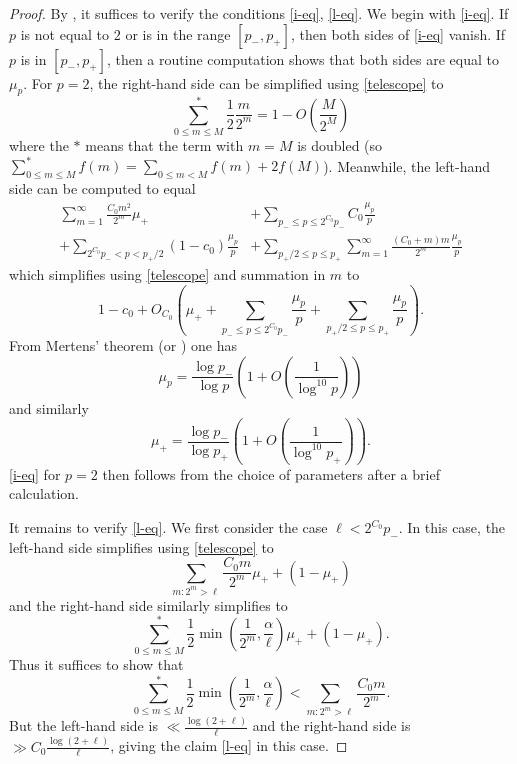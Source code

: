 \documentclass[10pt,a4paper,reqno]{amsart}
\numberwithin{equation}{section}
\theoremstyle{plain}
\theoremstyle{definition}
\begin{document}
\begin{proof}
By , it suffices to verify the conditions \eqref{i-eq}, \eqref{l-eq}.  We begin with \eqref{i-eq}.  If $p$ is not equal to $2$ or is in the range $[p_-,p_+]$, then both sides of \eqref{i-eq} vanish.  If $p$ is in $[p_-,p_+]$, then a routine computation shows that both sides are equal to $\mu_p$.  For $p=2$, the right-hand side can be simplified using \eqref{telescope} to
$$ \sum_{0 \leq m \leq M}^* \frac{1}{2} \frac{m}{2^m} = 1 - O\left( \frac{M}{2^M} \right)$$
where the $*$ means that the term with $m=M$ is doubled (so $\sum_{0 \leq m \leq M}^* f(m) = \sum_{0 \leq m<M} f(m) + 2 f(M)$).  Meanwhile, the left-hand side can be computed to equal
\begin{align*}
  \sum_{m=1}^\infty \frac{C_0 m^2}{2^m} \mu_+ & + \sum_{p_- \leq p \leq 2^{C_0} p_-} C_0 \frac{\mu_p}{p} \\
   + \sum_{2^{C_0} p_- < p < p_+/2} (1-c_0) \frac{\mu_p}{p} & + \sum_{p_+/2 \leq p \leq p_+} \sum_{m=1}^\infty \frac{(C_0+m) m}{2^m} \frac{\mu_p}{p}
\end{align*}
which simplifies using \eqref{telescope} and summation in $m$ to
$$ 1 - c_0 + O_{C_0}\left( \mu_+ + \sum_{p_- \leq p \leq 2^{C_0} p_-} \frac{\mu_p}{p} + \sum_{p_+/2 \leq p \leq p_+} \frac{\mu_p}{p}\right).$$
From Mertens' theorem (or ) one has
\begin{equation}\label{mertens}
  \mu_p = \frac{\log p_-}{\log p} \left( 1 + O\left( \frac{1}{\log^{10} p} \right) \right)
\end{equation}
and similarly
\begin{equation}\label{mertens-2}
  \mu_+ = \frac{\log p_-}{\log p_+} \left( 1 + O\left( \frac{1}{\log^{10} p_+} \right) \right).
\end{equation}
\eqref{i-eq} for $p=2$ then follows from the choice of parameters after a brief calculation.

It remains to verify \eqref{l-eq}.  We first consider the case $\ell < 2^{C_0} p_-$.  In this case, the left-hand side simplifies using \eqref{telescope} to
$$ \sum_{m: 2^m > \ell} \frac{C_0 m}{2^m} \mu_+ + (1-\mu_+)$$
and the right-hand side similarly simplifies to
$$ \sum_{0 \leq m \leq M}^* \frac{1}{2} \min\left( \frac{1}{2^m}, \frac{\alpha}{\ell}\right) \mu_+ + (1-\mu_+).$$
Thus it suffices to show that
\begin{equation}\label{lint} \sum_{0 \leq m \leq M}^* \frac{1}{2} \min\left( \frac{1}{2^m}, \frac{\alpha}{\ell}\right) < \sum_{m: 2^m > \ell} \frac{C_0 m}{2^m}.
\end{equation}
But the left-hand side is $\ll \frac{\log (2+\ell)}{\ell}$ and the right-hand side is $\gg C_0 \frac{\log (2+\ell)}{\ell}$, giving the claim \eqref{l-eq} in this case.


\end{proof}
\end{document}
